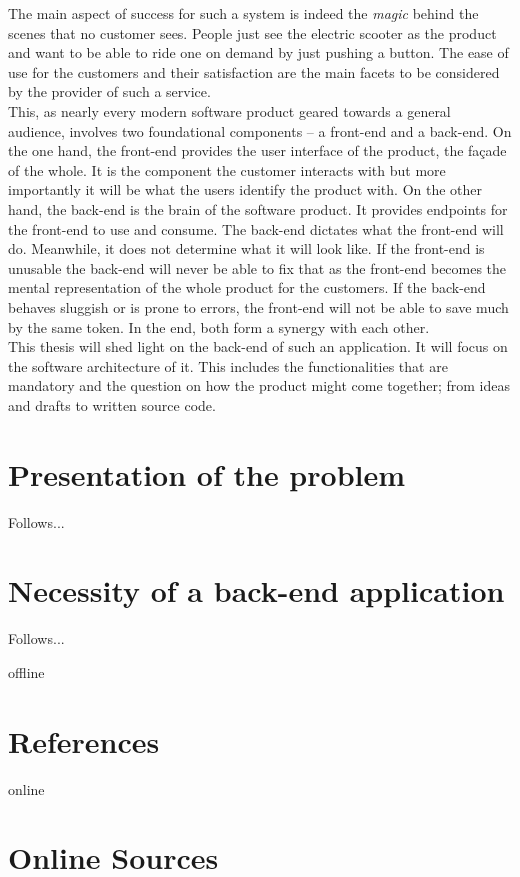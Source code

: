 \documentclass[12pt,a4paper]{report}
\begin{document}
The main aspect of success for such a system is indeed the \emph{magic} behind the scenes
that no customer sees. People just see the electric scooter as the product and
want to be able to ride one on demand by just pushing a button.
The ease of use for the customers and their satisfaction are the main facets
to be considered by the provider of such a service.\\
This, as nearly every modern software product geared towards a general audience,
involves two foundational components – a front-end and a back-end.
On the one hand, the front-end provides the user interface of the product, the façade of the whole.
It is the component the customer interacts with but more importantly it will be
what the users identify the product with.
On the other hand, the back-end is the brain of the software product.
It provides endpoints for the front-end to use and consume. The back-end dictates
what the front-end will do. Meanwhile, it does not determine what it will look like.
If the front-end is unusable the back-end will never be able to fix that as the
front-end becomes the mental representation of the whole product for the customers.
If the back-end behaves sluggish or is prone to errors, the front-end will not be able to save much
by the same token. In the end, both form a synergy with each other.\\
This thesis will shed light on the back-end of such an application.
It will focus on the software architecture of it.
This includes the functionalities that are mandatory and the question on how the product
might come together; from ideas and drafts to written source code.


\section{Presentation of the problem}

Follows...


\section{Necessity of a back-end application}

Follows...


\newpage



\begin{btSect}{offline}
\section*{References}
\btPrintCited
\end{btSect}
\begin{btSect}{online}
\section*{Online Sources}
\btPrintCited
\end{btSect}
\end{document}
